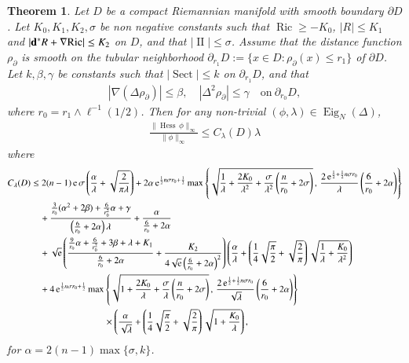 \documentclass[11pt,reqno]{amsart}
\newtheorem{theorem}{Theorem}[section]
\theoremstyle{definition} \newtheorem{remark}[theorem]{Remark}
\numberwithin{equation}{section}
\def\Ric{{\operatorname{Ric}}} \def\Hess{\operatorname{Hess}}
\def\Sect{{\operatorname{Sect}}}
\newcommand\1{\mathbbm{1}}
\def\Ric{{\operatorname{Ric}}} \def\Aut{{\operatorname{Aut}}}
\def\Eig{\operatorname{Eig}} \def\II{{\operatorname{II}}}
\def\bd{{\bf d}}
\def\r{\right}
\def\l{\left} \def\e{\operatorname{e}} \def\dsum{\displaystyle\sum}
\def\II{{\operatorname{II}}}
\begin{document}
 \begin{theorem}\label{main-theorem1}
Let $D$ be a compact Riemannian manifold with smooth
boundary $\partial D$. Let $K_0, K_1, K_2, \sigma$ be non negative constants such that  $\Ric\geq -K_0$, $|R|\leq K_1$ and $|\bd^* R+\nabla \Ric|\leq K_2$ on $D$, and  that $|\II|\leq \sigma$.  Assume that the distance function  $\rho_{\partial}$ is smooth on the tubular neighborhood $\partial_{r_1}D:=\{x\in D: \rho_{\partial }(x)\leq r_1\}$ of $\partial D$. Let $k, \beta, \gamma$ be constants such that  $|\Sect|\leq k$ on $\partial_{r_1}D$, and that
  \begin{align}\label{condition-rho}
    |\nabla (\Delta \rho_{\partial })|\leq \beta,\quad |\Delta^2 \rho_{\partial}|\leq \gamma  \quad 
    \mbox{on}\ \partial_{r_0}D,
  \end{align}
  where $r_0=r_1\wedge \ell^{-1}({1}/{2})$. 
 Then for any non-trivial
$(\phi,\lambda) \in \Eig_N(\Delta)$, 
\begin{align*}
\frac{\|\Hess \,\phi\|_{\infty}}{\|\phi\|_{\infty}}\leq C_{\lambda}(D)\lambda
\end{align*}
where
\begin{align}\label{add-Hess-D1}
C_{\lambda}(D)
&\leq  2(n-1)\e\sigma  \l(\frac{\alpha}{\lambda}+\sqrt{\frac{2}{\pi \lambda}}\r)+{2\alpha}\e^{\frac12 n \sigma r_0+\frac{1}{2}} \max \l\{\sqrt{\frac{1}{\lambda}+\frac{2K_0}{\lambda^2}+\frac{\sigma}{\lambda^2} \left(\frac{n}{r_0}+2\sigma\right)}\,,\, \frac{2\e^{\frac12+\frac12 n \sigma r_0}}{\lambda}\left( \frac{6}{r_0}+2\alpha\right)\r\} \notag\\
&\quad + \frac{\frac{3}{r_0}(\alpha^2+2\beta)+ \frac{6}{r_0^2}\alpha +\gamma}{ \left(\frac{6}{r_0}+2\alpha\right)\lambda}+\frac{\alpha}{\frac{6}{r_0}+2\alpha}\notag\\
&\quad+\sqrt{\e}\l(\frac{\frac{9}{r_0} \alpha + \frac{6}{r_0^2}  + 3\beta+\lambda  +K_1}{ \frac{6}{r_0}+2\alpha}  +\frac{K_2}{4\sqrt{\e}\left( \frac{6}{r_0}+2\alpha\right)^2}\r) \l(\frac{\alpha}{\lambda} +\l(\frac{1}{4}\sqrt{\frac{\pi}{2}}+\sqrt{\frac{2}{\pi}}\r)\sqrt{\frac{1}{\lambda}+\frac{K_0}{\lambda^2}}\r) \notag\\
  &\quad + 4\e^{\frac12 n \sigma r_0+\frac12}  \max \l\{\sqrt{1+\frac{2K_0}{\lambda}+\frac{\sigma}{\lambda} \left(\frac{n}{r_0}+2\sigma\right)}\,,\, \frac{2\e^{\frac12+\frac12 n \sigma r_0}}{\sqrt{\lambda}}\left( \frac{6}{r_0}+2\alpha\right)\r\}\\
  &\qquad\qquad\qquad\qquad\times \l(\frac{\alpha}{\sqrt{\lambda}} +\l(\frac{1}{4}\sqrt{\frac{\pi}{2}}+\sqrt{\frac{2}{\pi}}\r)\sqrt{1+\frac{K_0}{\lambda}}\r),\notag
\end{align}
for $\alpha=2(n-1)\max\{\sigma, k\}$.
\end{theorem}
\end{document}
